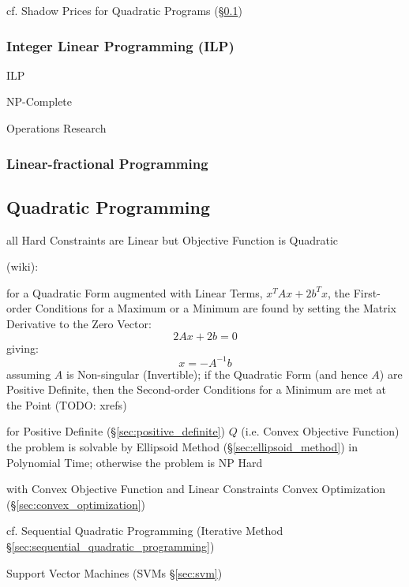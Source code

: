 \fist cf. Shadow Prices for Quadratic Programs
(\S\ref{sec:quadratic_programming})



\subsubsection{Integer Linear Programming (ILP)}\label{sec:ilp}

ILP

NP-Complete

Operations Research



\subsubsection{Linear-fractional Programming}
\label{sec:linear_fractional_programming}



\subsection{Quadratic Programming}\label{sec:quadratic_programming}

all Hard Constraints are Linear but Objective Function is Quadratic

(wiki):

for a Quadratic Form augmented with Linear Terms, $x^TAx + 2b^Tx$, the
First-order Conditions for a Maximum or a Minimum are found by setting the
Matrix Derivative to the Zero Vector:
\[
  2Ax + 2b = 0
\]
giving:
\[
  x = -A^{-1}b
\]
assuming $A$ is Non-singular (Invertible); if the Quadratic Form (and hence
$A$) are Positive Definite, then the Second-order Conditions for a
Minimum are met at the Point
(TODO: xrefs)

for Positive Definite (\S\ref{sec:positive_definite}) $Q$ (i.e. Convex
Objective Function) the problem is solvable by Ellipsoid Method
(\S\ref{sec:ellipsoid_method}) in Polynomial Time; otherwise the problem is NP
Hard

with Convex Objective Function and Linear Constraints \fist Convex Optimization
(\S\ref{sec:convex_optimization})

\fist cf. Sequential Quadratic Programming (Iterative Method
\S\ref{sec:sequential_quadratic_programming})

\fist Support Vector Machines (SVMs \S\ref{sec:svm})

